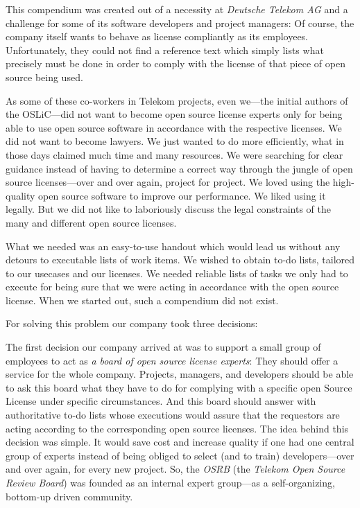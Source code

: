 This compendium was created out of a necessity at \emph{Deutsche Telekom AG} and
a challenge for some of its software developers and project managers: Of course,
the company itself wants to behave as license compliantly as its employees.
Unfortunately, they could not find a reference text which simply lists what
precisely must be done in order to comply with the license of that piece of open
source being used.

As some of these co-workers in Telekom projects, even we---the initial authors
of the OSLiC---did not want to become open source license experts only for being
able to use open source software in accordance with the respective licenses. We
did not want to become lawyers. We just wanted to do more efficiently, what
in those days claimed much time and many resources. We were searching for clear
guidance instead of having to determine a correct way through the jungle of open
source licenses---over and over again, project for project. We loved using the
high-quality open source software to improve our performance. We liked using it
legally. But we did not like to laboriously discuss the legal constraints of the
many and different open source licenses.

What we needed was an easy-to-use handout which would lead us without any
detours to executable lists of work items. We wished to obtain to-do lists,
tailored to our usecases and our licenses. We needed reliable lists of tasks we
only had to execute for being sure that we were acting in accordance with the
open source license. When we started out, such a compendium did not exist.

For solving this problem our company took three decisions:

The first decision our company arrived at was to support a small group of
employees to act as \emph{a board of open source license experts}: They should
offer a service for the whole company. Projects, managers, and developers should
be able to ask this board what they have to do for complying with a specific
open Source License under specific circumstances. And this board should answer
with authoritative to-do lists whose executions would assure that the requestors
are acting according to the corresponding open source licenses. The idea behind
this decision was simple. It would save cost and increase quality if one had one
central group of experts instead of being obliged to select (and to train)
developers---over and over again, for every new project. So, the \emph{OSRB} 
(the \emph{Telekom Open Source Review Board}) was founded as an internal expert
group---as a self-organizing, bottom-up driven community.

